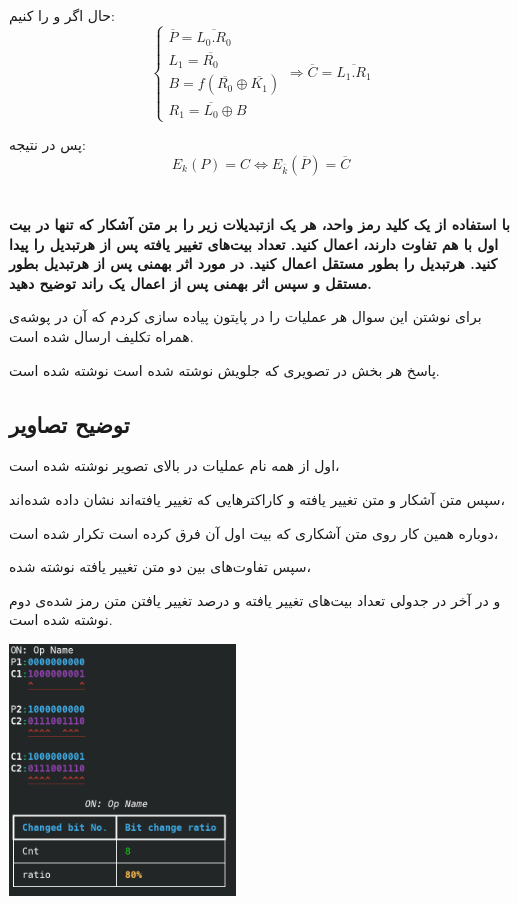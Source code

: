 \documentclass{article}
\begin{document}
\begin{enumerate}[label=\alph*)]
حال اگر 
و 
را 
کنیم:
\begin{equation}
\begin{cases}
\overline{P} = \overline{L_0.R_0}\\
L_1 = \overline{R_0} \\
B = f(\overline{R_0} \oplus \overline{K_1}) \\
R_1 = \overline{L_0} \oplus B
\end{cases}
\Rightarrow \overline{C} = \overline{L_1.R_1}
\end{equation}

پس در نتیجه:
\begin{equation}
E_k(P) = C \iff E_{\overline{k}}(\overline{P}) = \overline{C}
\end{equation}
\end{enumerate}

\section{}
{\large \textbf{با استفاده از یک کلید رمز واحد، هر یک ازتبدیلات زیر را بر متن آشکار که تنها در بیت اول با هم تفاوت دارند، اعمال کنید. تعداد بیت‌های تغییر یافته پس از هرتبدیل را پیدا کنید. هرتبدیل را بطور مستقل اعمال کنید. در مورد اثر بهمنی پس از هرتبدیل بطور مستقل و سپس اثر بهمنی پس از اعمال یک راند توضیح دهید.}}

برای نوشتن این سوال هر عملیات 
را در پایتون پیاده سازی کردم که 
آن در پوشه‌ی 
همراه تکلیف ارسال شده است.

پاسخ هر بخش در تصویری که جلویش نوشته شده‌ است نوشته شده است.

\subsection{توضیح تصاویر}
\begin{multicols}{2}
اول از همه نام عملیات در بالای تصویر نوشته شده است،

سپس متن آشکار و متن تغییر یافته و کاراکتر‌هایی که تغییر یافته‌اند نشان داده شده‌اند،

دوباره همین کار روی متن آشکاری که بیت اول آن فرق کرده است تکرار شده است،

سپس تفاوت‌های بین دو متن تغییر یافته نوشته شده،

و در آخر در جدولی تعداد بیت‌های تغییر یافته و درصد تغییر یافتن متن رمز شده‌ی دوم نوشته شده است.

\includegraphics[width=0.45\textwidth, height=0.35\textheight]{exam}
\end{multicols}
\end{document}
